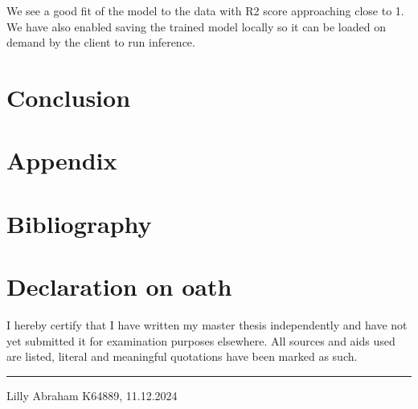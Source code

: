 \documentclass{report} %
\begin{document}
We see a good fit of the model to the data with R2 score approaching close to 1.
We have also enabled saving the trained model locally so it can be loaded on demand by the client to run inference.
\newpage 

\chapter*{Conclusion}

\newpage 

\newpage 

\listoffigures

\newpage 

\newpage 

\listoftables

\newpage 

\newpage 

\chapter*{Appendix}

\newpage 

\newpage 

\chapter*{Bibliography}
\newpage 

\newpage 

\chapter*{Declaration on oath}

\vspace{1cm}

\noindent I hereby certify that I have written my master thesis independently and have not yet submitted it for examination purposes elsewhere. All sources and aids used are listed, literal and meaningful quotations have been marked as such.

\vspace{3cm}
\hfill\rule{15cm}{0.4pt} %

\begin{center}
    Lilly Abraham K64889, 11.12.2024 %
\end{center}
\end{document}
